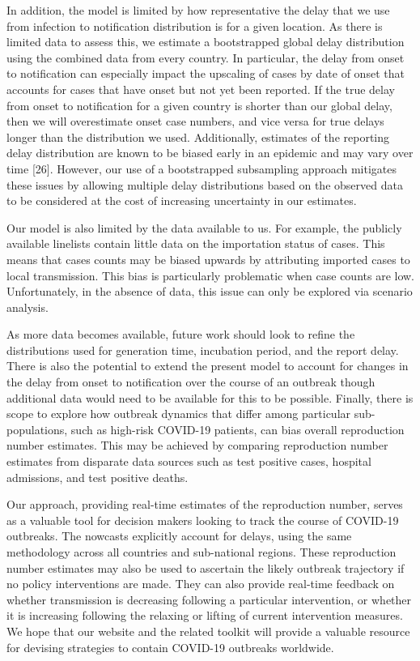 \documentclass[
]{article}
\begin{document}
In addition, the model is limited by how representative the delay that
we use from infection to notification distribution is for a given
location. As there is limited data to assess this, we estimate a
bootstrapped global delay distribution using the combined data from
every country. In particular, the delay from onset to notification can
especially impact the upscaling of cases by date of onset that accounts
for cases that have onset but not yet been reported. If the true delay
from onset to notification for a given country is shorter than our
global delay, then we will overestimate onset case numbers, and vice
versa for true delays longer than the distribution we used.
Additionally, estimates of the reporting delay distribution are known to
be biased early in an epidemic and may vary over time {[}26{]}. However,
our use of a bootstrapped subsampling approach mitigates these issues by
allowing multiple delay distributions based on the observed data to be
considered at the cost of increasing uncertainty in our estimates.

Our model is also limited by the data available to us. For example, the
publicly available linelists contain little data on the importation
status of cases. This means that cases counts may be biased upwards by
attributing imported cases to local transmission. This bias is
particularly problematic when case counts are low. Unfortunately, in the
absence of data, this issue can only be explored via scenario analysis.

As more data becomes available, future work should look to refine the
distributions used for generation time, incubation period, and the
report delay. There is also the potential to extend the present model to
account for changes in the delay from onset to notification over the
course of an outbreak though additional data would need to be available
for this to be possible. Finally, there is scope to explore how outbreak
dynamics that differ among particular sub-populations, such as high-risk
COVID-19 patients, can bias overall reproduction number estimates. This
may be achieved by comparing reproduction number estimates from
disparate data sources such as test positive cases, hospital admissions,
and test positive deaths.

Our approach, providing real-time estimates of the reproduction number,
serves as a valuable tool for decision makers looking to track the
course of COVID-19 outbreaks. The nowcasts explicitly account for
delays, using the same methodology across all countries and sub-national
regions. These reproduction number estimates may also be used to
ascertain the likely outbreak trajectory if no policy interventions are
made. They can also provide real-time feedback on whether transmission
is decreasing following a particular intervention, or whether it is
increasing following the relaxing or lifting of current intervention
measures. We hope that our website and the related toolkit will provide
a valuable resource for devising strategies to contain COVID-19
outbreaks worldwide.
\end{document}
